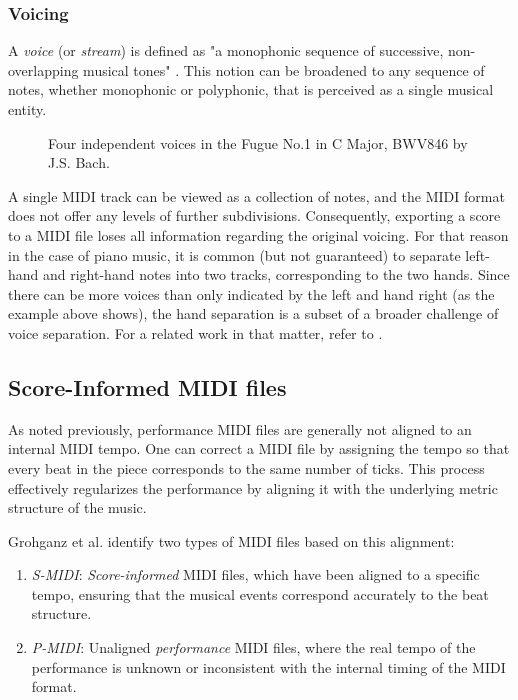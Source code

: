 \subsubsection{Voicing}

A \emph{voice} (or \emph{stream}) is defined as "a monophonic sequence of successive, non-overlapping musical tones" \cite{Karydis2007}. This notion can be broadened to any sequence of notes, whether monophonic or polyphonic, that is perceived as a single musical entity. 

\begin{figure}[ht!]
\centering

\caption[Four independent voices in the Fugue No.1 in C Major, BWV846 by J.S. Bach.]{Four independent voices in the Fugue No.1 in C Major, BWV846 by J.S. Bach.}
\end{figure}

A single MIDI track can be viewed as a collection of notes, and the MIDI format does not offer any levels of further subdivisions. Consequently, exporting a score to a MIDI file loses all information regarding the original voicing. For that reason in the case of piano music, it is common (but not guaranteed) to separate left-hand and right-hand notes into two tracks, corresponding to the two hands. Since there can be more voices than only indicated by the left and hand right (as the example above shows), the hand separation is a subset of a broader challenge of voice separation. For a related work in that matter, refer to \cite{Karydis2007}.
	
\subsection{Score-Informed MIDI files}\label{score-informed_midi_files}

As noted previously, performance MIDI files are generally not aligned to an internal MIDI tempo. One can correct a MIDI file by assigning the tempo so that every beat in the piece corresponds to the same number of ticks. This process effectively regularizes the performance by aligning it with the underlying metric structure of the music.

Grohganz et al. \cite{Grohganz2014} identify two types of MIDI files based on this alignment: \begin{enumerate}
	\item \emph{S-MIDI}: \emph{Score-informed} MIDI files, which have been aligned to a specific tempo, ensuring that the musical events correspond accurately to the beat structure.
	\item \emph{P-MIDI}: Unaligned \emph{performance} MIDI files, where the real tempo of the performance is unknown or inconsistent with the internal timing of the MIDI format. \end{enumerate}

